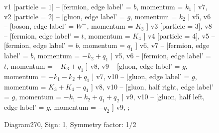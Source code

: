 \documentclass{revtex4}
\begin{document}
\begin{figure}[!htb]
\begin{center}
{    %
v1 [particle = \(1\)] -- [fermion, edge label' = \(b\), momentum = \(k_{1}\) ] v7, 
v2 [particle = \(2\)] -- [gluon, edge label' = \(g\), momentum = \(k_{2}\) ] v5, 
v6 -- [boson, edge label' = \(W^{-}\), momentum = \(K_{3}\) ] v3 [particle = \(3\)], 
v8 -- [fermion, edge label' = \(t\), momentum = \(K_{4}\) ] v4 [particle = \(4\)], 
v5 -- [fermion, edge label' = \(b\), momentum = \(q_{1}\) ] v6, 
v7 -- [fermion, edge label' = \(b\), momentum = \(-k_{2} + q_{1}\) ] v5, 
v6 -- [fermion, edge label' = \(t\), momentum = \(-K_{3} + q_{1}\) ] v8, 
v9 -- [gluon, edge label' = \(g\), momentum = \(-k_{1} - k_{2} + q_{1}\) ] v7, 
v10 -- [gluon, edge label' = \(g\), momentum = \(K_{3} + K_{4} - q_{1}\) ] v8, 
v10 -- [gluon, half right, edge label' = \(g\), momentum = \(-k_{1} - k_{2} + q_{1} + q_{2}\) ] v9, 
v10 -- [gluon, half left, edge label' = \(g\), momentum = \(-q_{2}\) ] v9, 
};
\end{center}
\caption{Diagram270, Sign: 1, Symmetry factor: 1/2}
\end{figure}
\newpage
\end{document}

